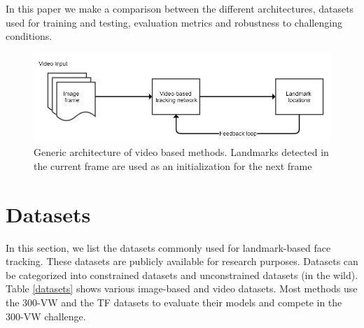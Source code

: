 \documentclass{llncs}
\begin{document}
In this paper we make a comparison between the different architectures, datasets used for training and testing, evaluation metrics and robustness to challenging conditions. 

\begin{figure}[h!]
\centering
\includegraphics[scale=0.5]{Media/generic_video_based}
\caption{Generic architecture of video based methods. Landmarks detected in the current frame are used as an initialization for the next frame}
\label{generic_video_based}
\end{figure}

\section{Datasets}

In this section, we list the datasets commonly used for landmark-based face tracking. These datasets are publicly available for research purposes. Datasets can be categorized into constrained datasets and unconstrained datasets (in the wild).
Table \ref{datasets} shows various image-based and video datasets. Most methods use the 300-VW\cite{300-VW_2} and the TF\cite{tf} datasets to evaluate their models and compete in the 300-VW challenge. 
\end{document}
